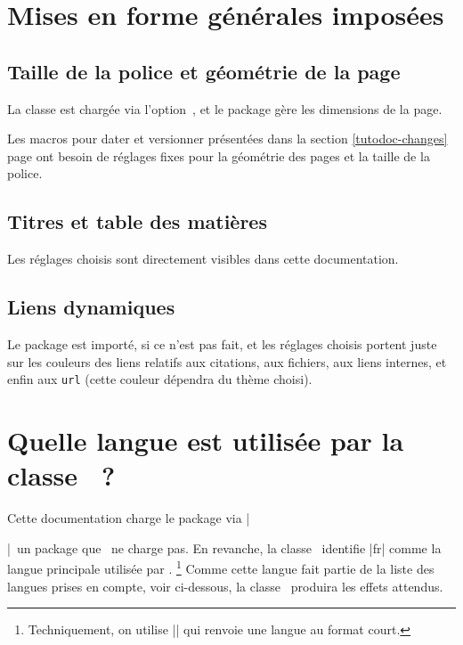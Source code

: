 \section{Mises en forme générales imposées}

\subsection{Taille de la police et géométrie de la page}

La classe  est chargée via l'option \,, et le package  gère les dimensions de la page.


\begin{tdocwarn}
	Les macros pour dater et versionner présentées dans la section \ref{tutodoc-changes} page \pageref{tutodoc-changes} ont besoin de réglages fixes pour la géométrie des pages et la taille de la police.
\end{tdocwarn}


\subsection{Titres et table des matières}

Les réglages choisis sont directement visibles dans cette documentation.


\subsection{Liens dynamiques}

Le package  est importé, si ce n'est pas fait, et les réglages choisis portent juste sur les couleurs des liens relatifs aux citations, aux fichiers, aux liens internes, et enfin aux \verb#url# (cette couleur dépendra du thème choisi).


\section{Quelle langue est utilisée par la classe \thisproj\ ?}

Cette documentation charge le package  via \tdoclatexin|\usepackage[english]{babel}|\, un package que \thisproj\ ne charge pas.
En revanche, la classe \thisproj\ identifie \tdoclatexin|fr| comme la langue principale utilisée par .%
\footnote{
    Techniquement, on utilise \tdoclatexin|| qui renvoie une langue au format court.
}
Comme cette langue fait partie de la liste des langues prises en compte, voir ci-dessous, la classe \thisproj\ produira les effets attendus.

